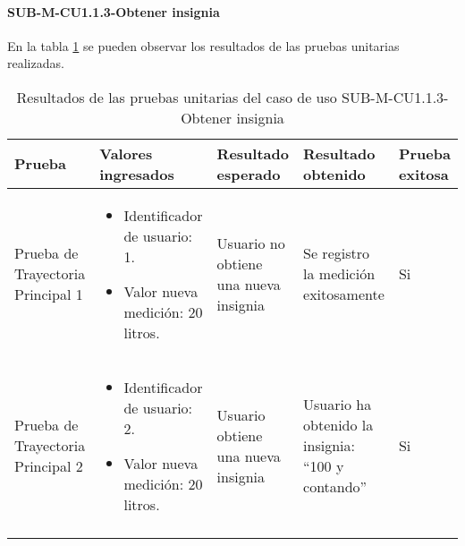 \paragraph{SUB-M-CU1.1.3-Obtener insignia}\label{SUB-M-CU1.1.3:Pruebas}
En la tabla \ref{pruebas_unitarias_sub-m-cu1.1.3} se pueden observar los resultados de las pruebas unitarias realizadas.
\begin{longtable}{|M{2cm}| M{4.5cm}|M{3cm}|M{3cm}|M{1.5cm}|}
	\hline
	\textbf{Prueba} & \textbf{Valores ingresados} & \textbf{Resultado esperado} & \textbf{Resultado obtenido} & \textbf{Prueba exitosa} \\ \hline
	Prueba de Trayectoria Principal 1& 
	\begin{itemize}
		\item Identificador de usuario: 1.
		\item Valor nueva medición: 20 litros.
	\end{itemize}
	& Usuario no obtiene una nueva insignia & Se registro la medición exitosamente & Si \\ \hline
	Prueba de Trayectoria Principal 2& 
	\begin{itemize}
		\item Identificador de usuario: 2.
		\item Valor nueva medición: 20 litros.
	\end{itemize}
	& Usuario obtiene una nueva insignia & Usuario ha obtenido la insignia: ``100 y contando'' & Si \\ \hline
	\caption{Resultados de las pruebas unitarias del caso de uso SUB-M-CU1.1.3-Obtener insignia}
	\label{pruebas_unitarias_sub-m-cu1.1.3}
\end{longtable}

